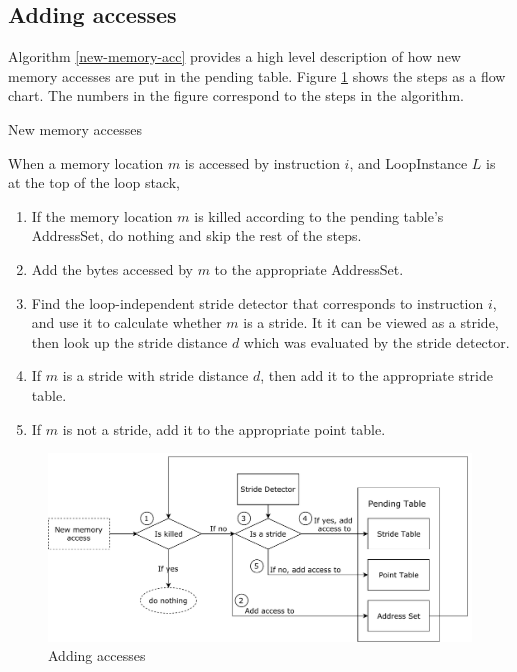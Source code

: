 \documentclass[12pt,twoside]{reedthesis}
\begin{document}
			
		\subsection{Adding accesses}\label{s:add-accesses}
		
		Algorithm \ref{new-memory-acc} provides a high level description of how new memory accesses are put in the pending table. Figure \ref{fig:add-access} shows the steps as a flow chart. The numbers in the figure correspond to the steps in the algorithm.%
		
		\begin{algorithm}
			\caption{New memory accesses}\label{new-memory-acc}
			When a memory location $m$ is accessed by instruction $i$, and LoopInstance $L$ is at the top of the loop stack,
			\begin{enumerate}
				\item If the memory location $m$ is killed according to the pending table's AddressSet, do nothing and skip the rest of the steps. 
				\item Add the bytes accessed by $m$ to the appropriate AddressSet.
				\item Find the loop-independent stride detector that corresponds to instruction $i$, and use it to calculate whether $m$ is a stride. It it can be viewed as a stride, then look up the stride distance $d$ which was evaluated by the stride detector. 
				\item If $m$ is a stride with stride distance $d$, then add it to the appropriate stride table.
				\item If $m$ is not a stride, add it to the appropriate point table. 
			\end{enumerate} 
		\end{algorithm}
	
		
		\begin{figure}
			\caption{Adding accesses}
			\label{fig:add-access}
			\includegraphics[scale=0.65]{add_access.pdf}
		\end{figure}
		
\end{document}

